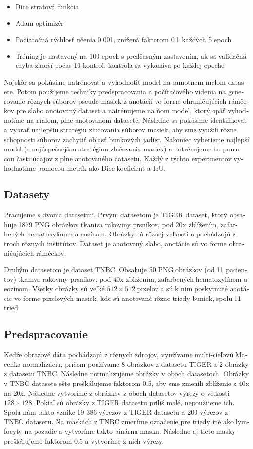 \begin{otherlanguage}{slovak}
\begin{itemize}
    \item Dice stratová funkcia
    \item Adam optimizér
    \item Počiatočná rýchlosť učenia 0.001, znížená faktorom 0.1 každých 5 epoch
    \item Tréning je nastavený na 100 epoch s predčasným zastavením, ak sa validačná chyba zhorší počas 10 kontrol, kontrola sa vykonáva po každej epoche
\end{itemize}

Najskôr sa pokúsime natrénovať a vyhodnotiť model na samotnom malom datasete. Potom použijeme techniky predspracovania a počítačového videnia na generovanie rôznych súborov pseudo-masiek z anotácií vo forme ohraničujúcich rámčekov pre slabo anotovaný dataset a natrénujeme na ňom model, ktorý opäť vyhodnotíme na malom, plne anotovanom datasete. Následne sa pokúsime identifikovať a vybrať najlepšiu stratégiu zlučovania súborov masiek, aby sme využili rôzne schopnosti súborov zachytiť oblasť bunkových jadier. Nakoniec vyberieme najlepší model (s najúspešnejšou stratégiou zlučovania masiek) a dotrénujeme ho pomocou časti údajov z plne anotovaného datasetu. Každý z týchto experimentov vyhodnotíme pomocou metrík ako Dice koeficient a IoU.

\subsection{Datasety}
Pracujeme s dvoma datasetmi. Prvým datasetom je TIGER dataset, ktorý obsahuje 1879 PNG obrázkov tkaniva rakoviny prsníkov, pod 20x zblížením, zafarbených hematoxylínom a eozínom. Obrázky sú rôznej veľkosti a pochádzajú z troch rôznych inštitútov. Dataset je anotovaný slabo, anotácie sú vo forme ohraničujúcich rámčekov.

Druhým datasetom je dataset TNBC. Obsahuje 50 PNG obrázkov (od 11 pacientov) tkaniva rakoviny prsníkov, pod 40x zblížením, zafarbených hematoxylínom a eozínom. Všetky obrázky sú veľké $512\!\times\!512$ pixelov a sú k nim poskytnuté anotácie vo forme pixelových masiek, kde sú anotované rôzne triedy buniek, spolu 11 tried.

\subsection{Predspracovanie}
Keďže obrazové dáta pochádzajú z rôznych zdrojov, využívame multi-cieľovú Macenko normalizáciu, pričom používame 8 obrázkov z datasetu TIGER a 2 obrázky z datasetu TNBC. Následne normalizujeme obrázky v oboch datasetoch. Obrázky v TNBC datasete ešte preškálujeme faktorom 0.5, aby sme zmenili zblíženie z 40x na 20x. Následne vytvoríme z obrázkov z oboch datasetov výrezy o veľkosti $128\!\times\!128$. Pokiaľ sú obrázky z TIGER datasetu príliš malé, nepoužijeme ich. Spolu nám takto vznike 19 386 výrezov z TIGER datasetu a 200 výrezov z TNBC datasetu. Na maskách z TNBC zmeníme označenie pre triedy iné ako lymfocyty na pozadie a vytvoríme takto binárnu masku. Následne aj tieto masky preškálujeme faktorom 0.5 a vytvoríme z nich výrezy.


\end{otherlanguage}
